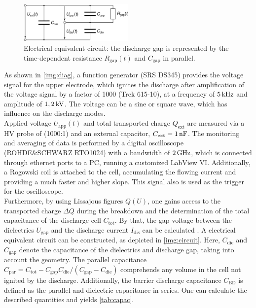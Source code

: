\documentclass[a4paper,10pt,twoside]{article}
\newcommand{\ix}[1]{_\text{#1}}
\begin{document}
				\begin{figure}
					\centering
					\includegraphics[width=0.5\textwidth]{figures/setup/replacementcircuit.pdf}
					\caption{Electrical equivalent circuit: the discharge gap is represented by the time-dependent resistance $R\ix{gap}(t)$ and $C\ix{gap}$ in parallel.}
					\label{img:circuit}
				\end{figure}
				
			 As shown in \autoref{img:diag}, a function generator (SRS DS345) provides the voltage signal for the upper electrode, which ignites the discharge after amplification of the voltage signal by a factor of 1000 (Trek 615-10), at a frequency of $\unit[5]{kHz}$ and amplitude of $\unit[1,2]{kV}$. The voltage can be a sine or square wave, which has influence on the discharge modes.\\
			 Applied voltage $U\ix{app}(t)$ and total transported charge $Q\ix{ext}$ are measured via a HV probe of (1000:1) and an external capacitor, $C\ix{ext}=\unit[1]{nF}$. The monitoring and averaging of data is performed by a digital oscilloscope (ROHDE\&SCHWARZ RTO1024) with a bandwidth of $\unit[2]{GHz}$, which is connected through ethernet ports to a PC, running a customized LabView VI. Additionally, a Rogowski coil is attached to the cell, accumulating the flowing current and providing a much faster and higher slope. This signal also is used as the trigger for the oscilloscope.\\
			 Furthermore, by using Lissajous figures $Q(U)$, one gains access to the transported charge $\Delta Q$ during the breakdown and the determination of the total capacitance of the discharge cell $C\ix{tot}$. By that, the gap voltage between the dielectrics $U\ix{gap}$ and the discharge current $I\ix{dis}$ can be calculated \cite{Kogelschatz2003}. A electrical equivalent circuit can be constructed, as depicted in \autoref{img:circuit}. Here, $C\ix{die}$ and $C\ix{gap}$ denote the capacitance of the dielectrics and discharge gap, taking into account the geometry. The parallel capacitance $C\ix{par}=C\ix{tot}-C\ix{gap}C\ix{die}/\left(C\ix{gap}-C\ix{die}\right)$ comprehends any volume in the cell not ignited by the discharge. Additionally, the barrier discharge capacitance $C\ix{BD}$ is defined as the parallel and dielectric capacitance in series. One can calculate the described quantities and yields \autoref{tab:capac}.
			 
\end{document}
